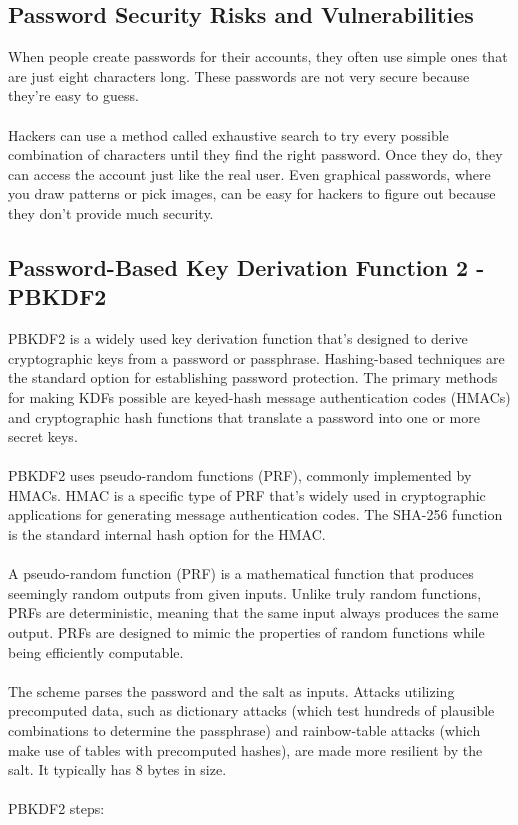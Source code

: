 \documentclass[10pt,oneside,english,a4paper]{article}
\begin{document}
\subsection{Password Security Risks and Vulnerabilities}
When people create passwords for their accounts, they often use simple ones that are just eight characters long. These passwords are not very secure because they're easy to guess. 
\\\\
Hackers can use a method called exhaustive search to try every possible combination of characters until they find the right password. Once they do, they can access the account just like the real user. Even graphical passwords, where you draw patterns or pick images, can be easy for hackers to figure out because they don't provide much security.

\subsection{Password-Based Key Derivation Function 2 - PBKDF2}
PBKDF2 is a widely used key derivation function that's designed to derive cryptographic keys from a password or passphrase.
Hashing-based techniques are the standard option for establishing password protection. The primary methods for making KDFs possible are keyed-hash message authentication codes (HMACs) and cryptographic hash functions that translate a password into one or more secret keys.
\\\\
PBKDF2 uses pseudo-random functions (PRF), commonly implemented by HMACs.
HMAC is a specific type of PRF that's widely used in cryptographic applications for generating message authentication codes.
The SHA-256 function is the standard internal hash option for the HMAC. 
\\\\
A pseudo-random function (PRF) is a mathematical function that produces seemingly random outputs from given inputs.
Unlike truly random functions, PRFs are deterministic, meaning that the same input always produces the same output.
PRFs are designed to mimic the properties of random functions while being efficiently computable.
\\\\
The scheme parses the password and the salt as inputs.
Attacks utilizing precomputed data, such as dictionary attacks (which test hundreds of plausible combinations to determine the passphrase) and rainbow-table attacks (which make use of tables with precomputed hashes), are made more resilient by the salt. 
It typically has 8 bytes in size.\\\\
PBKDF2 steps:
\end{document}
